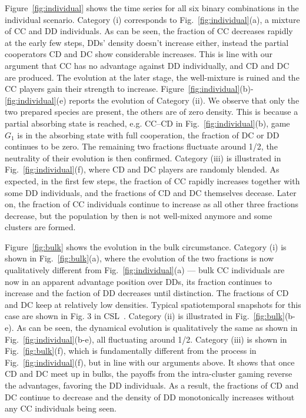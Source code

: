 \documentclass[showpacs,superscriptaddress,reprint,nofootinbib,amsmath,amssymb,aps,pre]{revtex4-1}
\begin{document}
Figure~{\ref{fig:individual}} shows the time series for all six  binary combinations in the individual scenario. Category (i) corresponds to Fig.~{\ref{fig:individual}}(a), a mixture of CC and DD individuals. As can be seen, the fraction of CC decreases rapidly at the early few steps, DDs' density doesn't increase either,  instead the partial cooperators CD and DC show considerable increases. This is line with our argument that CC has no advantage against DD individually, and CD and DC are produced. The evolution at the later stage, the well-mixture is ruined and the CC players gain their strength to increase.
Figure~\ref{fig:individual}(b)-\ref{fig:individual}(e) reports the evolution of Category (ii). We observe that only the two prepared species are present, the others are of zero density. This is because a partial absorbing state is reached, e.g. CC--CD in Fig.~\ref{fig:individual}(b), game $G_1$ is in the absorbing state with full cooperation, the fraction of DC or DD continues to be zero. The remaining two fractions fluctuate around 1/2, the neutrality of their evolution is then confirmed.
Category (iii) is illustrated in Fig.~\ref{fig:individual}(f), where CD and DC players are randomly blended. As expected, in the first few steps, the fraction of CC rapidly increases together with some DD individuals, and the fractions of CD and DC themselves decease. Later on, the fraction of CC individuals continue to increase as all other three fractions decrease, but the population by then is not well-mixed anymore and some clusters are formed.

Figure~{\ref{fig:bulk}} shows the evolution in the bulk circumstance.
Category (i) is shown in Fig.~\ref{fig:bulk}(a), where the evolution of the two fractions is now qualitatively different from Fig.~\ref{fig:individual}(a) --- bulk CC individuals are now in an apparent advantage position over DDs, its fraction continues to increase and the faction of DD decreases until distinction. The fractions of CD and DC keep at relatively low densities. Typical spatiotemporal snapshots for this case are shown in Fig. 3 in CSL~\cite{CSL}. 
Category (ii) is illustrated in Fig.~\ref{fig:bulk}(b-e). As can be seen, the dynamical evolution is qualitatively the same as shown in Fig.~\ref{fig:individual}(b-e), all fluctuating around 1/2.  
Category (iii) is shown in Fig.~\ref{fig:bulk}(f), which is fundamentally different from the process in Fig.~\ref{fig:individual}(f), but in line with our arguments above. It shows that once CD and DC meet up in bulks, the payoffs from the intra-cluster gaming reverse the advantages, favoring the DD individuals.
As a result, the fractions of CD and DC continue to decrease and the density of DD monotonically increases without any CC individuals being seen.
\end{document}
